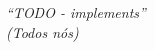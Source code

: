 \begin{epigrafe}
    \vspace*{\fill}
    \begin{flushright}
        \textit{“TODO - implements”\\
        (Todos nós)}
    \end{flushright}
\end{epigrafe}